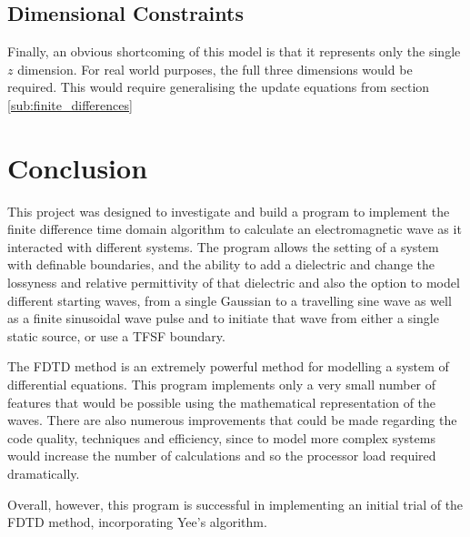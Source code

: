 \subsection{Dimensional Constraints} %
\label{sub:dimensional_constraints}
Finally, an obvious shortcoming of this model is that it represents only the single $z$ dimension. For real world purposes, the full three dimensions would be required. This would require generalising the update equations from section \ref{sub:finite_differences}

\section{Conclusion} %
\label{sec:conclusion}
This project was designed to investigate and build a program to implement the finite difference time domain algorithm to calculate an electromagnetic wave as it interacted with different systems. The program allows the setting of a system with definable boundaries, and the ability to add a dielectric and change the lossyness and relative permittivity of that dielectric and also the option to model different starting waves, from a single Gaussian to a travelling sine wave as well as a finite sinusoidal wave pulse and to initiate that wave from either a single static source, or use a TFSF boundary.

The FDTD method is an extremely powerful method for modelling a system of differential equations. This program implements only a very small number of features that would be possible using the mathematical representation of the waves. There are also numerous improvements that could be made regarding the code quality, techniques and efficiency, since to model more complex systems would increase the number of calculations and so the processor load required dramatically.

Overall, however, this program is successful in implementing an initial trial of the FDTD method, incorporating Yee's algorithm.
